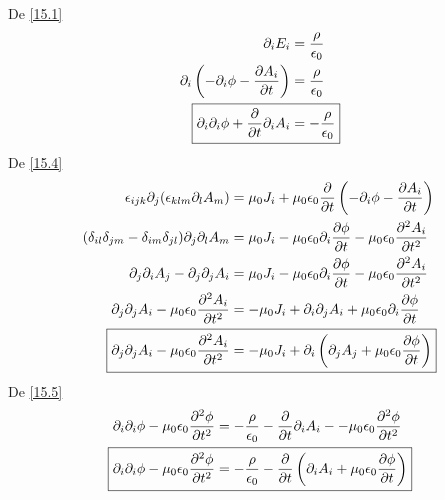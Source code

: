 De \eqref{15.1}
\begin{align}
  \partial_iE_i&=\frac{\rho}{\epsilon_0}\\
  \partial_i\left(-\partial_i\f -\pdv{A_i}{t}\right)&=\frac{\rho}{\epsilon_0}\\
 \Aboxed{ \partial_i\partial_i\f +\pdv{t}\partial_i A_i&=-\frac{\rho}{\epsilon_0}}\label{15.5}
\end{align}
De \eqref{15.4}
\begin{align}
  \epsilon_{ijk}\partial_j(\epsilon_{klm}\partial_l A_m)&=\m_0J_i+\m_0\epsilon_0\pdv{t}\left(-\partial_i\f -\pdv{A_i}{t}\right)\\
  (\delta_{il}\d_{jm}-\d_{im}\d_{jl})\partial_j\partial_l A_m&=\m_0 J_i-\m_0\epsilon_0 \partial_i\pdv{\f}{t}-\m_0\epsilon_0\pdv[2]{A_i}{t}\\
  \partial_j\partial_iA_j-\partial_j\partial_jA_i&=\m_0 J_i-\m_0\epsilon_0\partial_i\pdv{\f }{t}-\m_0\epsilon_0\pdv[2]{A_i}{t}\\
  \partial_j\partial_j A_i-\m_0\epsilon_0\pdv[2]{A_i}{t}&=-\m_0J_i+\partial_i\partial_jA_i+\m_0\epsilon_0 \partial_i\pdv{\f }{t}\\
\Aboxed{ \partial_j\partial_j A_i-\m_0\epsilon_0\pdv[2]{A_i}{t}&=-\m_0J_i+\partial_i\left(\partial_jA_j+\m_0\epsilon_0\pdv{\f }{t}\right)}
\end{align}
De \eqref{15.5}
\begin{align}
  \partial_i\partial_i\f-\m_0\epsilon_0\pdv[2]{\f }{t} &=-\frac{\rho}{\epsilon_0}-\pdv{t}\partial_i A_i--\m_0\epsilon_0\pdv[2]{\f }{t}\\
 \Aboxed{ \partial_i\partial_i\f -\m_0\epsilon_0\pdv[2]{\f }{t}&=-\frac{\rho}{\epsilon_0}-\pdv{t}\left(\partial_iA_i+\m_0\epsilon_0\pdv{\f }{t}\right)}
\end{align}




































